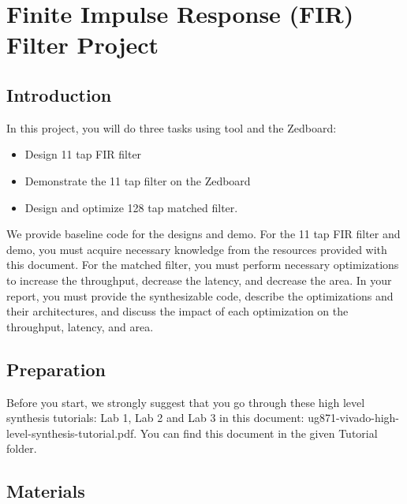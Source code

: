 \chapter{Finite Impulse Response (FIR) Filter Project}
\glsresetall
\label{chapter:FIR_Project}

\section{Introduction}

In this project, you will do three tasks using \VHLS tool and the Zedboard:
\begin{itemize}
\item Design 11 tap FIR filter
\item Demonstrate the 11 tap filter on the Zedboard
\item Design and optimize 128 tap matched filter. 
\end{itemize}

We provide baseline code for the designs and demo. For the 11 tap FIR filter and demo, you must acquire necessary knowledge from the resources provided with this document. For the matched filter, you must perform necessary optimizations to increase the throughput, decrease the latency, and decrease the area. In your report, you must provide the synthesizable code, describe the optimizations and their architectures, and discuss the impact of each optimization on the throughput, latency, and area.

\section{Preparation}
Before you start, we strongly suggest that you go through these high level synthesis tutorials: Lab 1, Lab 2 and Lab 3 in this document: ug871-vivado-high-level-synthesis-tutorial.pdf. You can find this document in the given Tutorial folder. 

\section{Materials}

